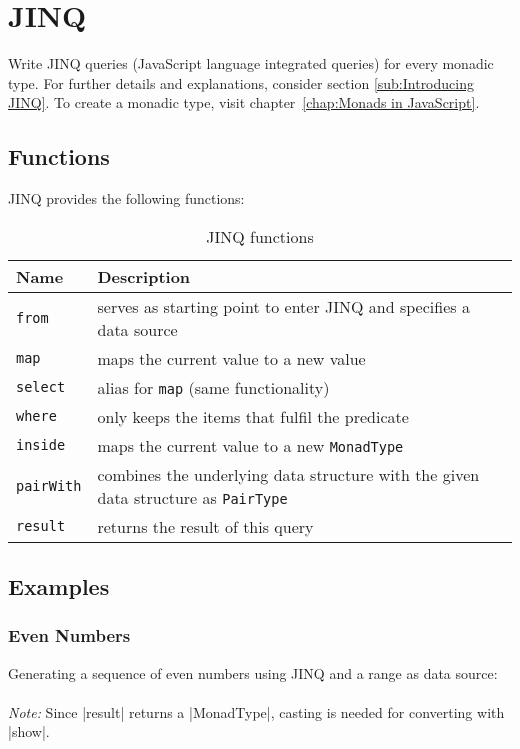 \section{JINQ} %
\label{sec:API_JINQ}
Write JINQ queries (JavaScript language integrated queries) for every monadic type.
\newline
For further details and explanations, consider section \ref{sub:Introducing JINQ}.
\newline
To create a monadic type, visit chapter~\ref{chap:Monads in JavaScript}.

\subsection{Functions}
\label{sub:JINQ_Functions}
JINQ provides the following functions:

\begin{table}[H]
  \centering
  \begin{tabularx}{\textwidth}{| l | X |} \hline
    \textbf{Name}       & \textbf{Description} \\ \hline
    \texttt{from}       & serves as starting point to enter JINQ and specifies a data source \\ \hline 
    \texttt{map}        & maps the current value to a new value \\ \hline 
    \texttt{select}     & alias for \texttt{map} (same functionality) \\ \hline 
    \texttt{where}      & only keeps the items that fulfil the predicate \\ \hline
    \texttt{inside}     & maps the current value to a new \texttt{MonadType} \\ \hline 
    \texttt{pairWith}   & combines the underlying data structure with the given data structure as \texttt{PairType} \\ \hline 
    \texttt{result}     & returns the result of this query\\ \hline 

  \end{tabularx}
  \caption{JINQ functions}
  \label{tab:jinq_functions}
\end{table}

\subsection{Examples}
\label{sub:JINQ_Examples}

\subsubsection{Even Numbers}
\label{subsub:JINQ_Even Numbers}
Generating a sequence of even numbers using JINQ and a range as data source:\\
\\
\textit{Note:} Since |result| returns a |MonadType|, casting is needed
for converting with |show|.

